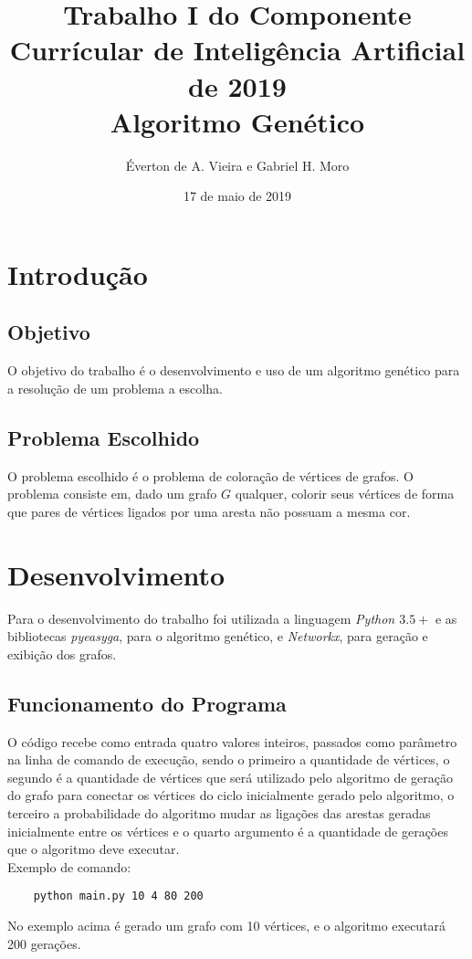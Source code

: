 \documentclass[a4paper, 12pt]{article}
\title{Trabalho I do Componente Currícular de Inteligência Artificial de 2019 \\ %
        \large Algoritmo Genético}
\author{Éverton de A. Vieira e Gabriel H. Moro}
\date{17 de maio de 2019}
\begin{document}
    \maketitle{}
    
    \section*{Introdução}
    \subsection*{Objetivo}
    O objetivo do trabalho é o desenvolvimento e uso de um algoritmo genético para a resolução de um problema a escolha. 
    \subsection*{Problema Escolhido}
    O problema escolhido é o problema de coloração de vértices de grafos. O problema consiste em, dado um grafo $G$ qualquer, colorir seus vértices de forma que pares de vértices ligados por uma aresta não possuam a mesma cor.

    \section*{Desenvolvimento}
    Para o desenvolvimento do trabalho foi utilizada a linguagem \emph{Python $3.5+$} e as bibliotecas \emph{pyeasyga}, para o algoritmo genético, e \emph{Networkx}, para geração e exibição dos grafos.
    \subsection*{Funcionamento do Programa}
    O código recebe como entrada quatro valores inteiros, passados como parâmetro na linha de comando de execução, sendo o primeiro a quantidade de vértices,
    o segundo é a quantidade de vértices que será utilizado pelo algoritmo de geração do grafo para conectar os vértices do ciclo inicialmente gerado pelo algoritmo,
    o terceiro a probabilidade do algoritmo mudar as ligações das arestas geradas inicialmente entre os vértices 
    e o quarto argumento é a quantidade de gerações que o algoritmo deve executar.\\ %

    Exemplo de comando:
    \begin{verbatim}
    python main.py 10 4 80 200
    \end{verbatim}

    No exemplo acima é gerado um grafo com 10 vértices, e o algoritmo executará 200 gerações.
       
\end{document}
